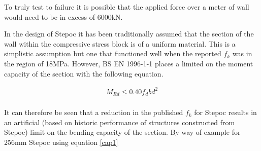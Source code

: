 \documentclass[11pt]{article}
\begin{document}
To truly test to failure it is possible that the applied force over a
meter of wall would need to be in excess of 6000kN.

In the design of Stepoc it has been traditionally assumed that the
section of the wall within the compressive stress block is of a uniform
material. This is a simplistic assumption but one that functioned well
when the reported \(f_k\) was in the region of 18MPa. However, BS EN
1996-1-1 places a limited on the moment capacity of the section with the
following equation.

\begin{align} 
M_{Rd} \leq 0.40 f_d b d^2\label{cap1}\\
\end{align}

It can therefore be seen that a reduction in the published \(f_k\) for
Stepoc results in an artificial (based on historic performance of
structures constructed from Stepoc) limit on the bending capacity of the
section. By way of example for 256mm Stepoc using equation \ref{cap1}
\end{document}
